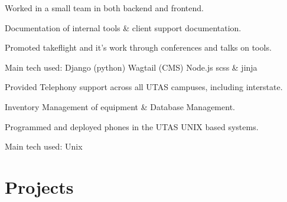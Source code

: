 \documentclass[a4paper]{deedy-resume} %
\begin{document}
\begin{minipage}[t]{0.66\textwidth}
  \begin{tightitemize}
  \item Worked in a small team in both backend and frontend.
  \item Documentation of internal tools \& client support documentation.
  \item Promoted takeflight and it's work through conferences and talks on tools.
  \end{tightitemize}
  Main tech used: \textbullet{} Django (python) \textbullet{} Wagtail (CMS) \textbullet{} Node.js \textbullet{} scss \& jinja

  \sectionspace %



  \begin{tightitemize}
  \item Provided Telephony support across all UTAS campuses, including interstate.
  \item Inventory Management of equipment \& Database Management.
  \item Programmed and deployed phones in the UTAS UNIX based systems.
  \end{tightitemize}
  Main tech used: \textbullet{} Unix

  \sectionspace %



  \section{Projects}



\end{minipage}
\end{document}
